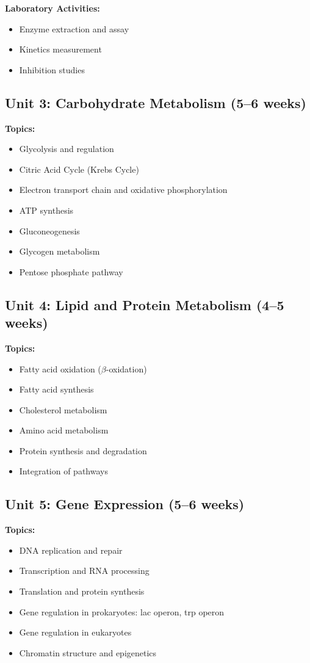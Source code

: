 \documentclass[12pt,oneside]{book}
\begin{document}
\textbf{Laboratory Activities:}
\begin{itemize}
    \item Enzyme extraction and assay
    \item Kinetics measurement
    \item Inhibition studies
\end{itemize}

\subsection{Unit 3: Carbohydrate Metabolism (5--6 weeks)}

\textbf{Topics:}
\begin{itemize}
    \item Glycolysis and regulation
    \item Citric Acid Cycle (Krebs Cycle)
    \item Electron transport chain and oxidative phosphorylation
    \item ATP synthesis
    \item Gluconeogenesis
    \item Glycogen metabolism
    \item Pentose phosphate pathway
\end{itemize}

\subsection{Unit 4: Lipid and Protein Metabolism (4--5 weeks)}

\textbf{Topics:}
\begin{itemize}
    \item Fatty acid oxidation ($\beta$-oxidation)
    \item Fatty acid synthesis
    \item Cholesterol metabolism
    \item Amino acid metabolism
    \item Protein synthesis and degradation
    \item Integration of pathways
\end{itemize}

\subsection{Unit 5: Gene Expression (5--6 weeks)}

\textbf{Topics:}
\begin{itemize}
    \item DNA replication and repair
    \item Transcription and RNA processing
    \item Translation and protein synthesis
    \item Gene regulation in prokaryotes: lac operon, trp operon
    \item Gene regulation in eukaryotes
    \item Chromatin structure and epigenetics
\end{itemize}
\end{document}
